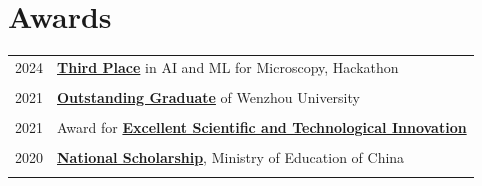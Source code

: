 \documentclass[a4paper,10pt]{article} %
\begin{document}
\section{Awards}
\begin{tabular}{r|l}	
2024                        & \href{https://way2ml.github.io/_static/cv/2025-01-09-00-25-Hackathon_Microscopy.pdf}{\textbf{Third Place}} in AI and ML for Microscopy, Hackathon \\
\multicolumn{2}{c}{} \\	%


2021                        & \href{https://way2ml.github.io/_static/cv/2021_11_26_10_1.pdf}{\textbf{Outstanding Graduate}} of Wenzhou University\\ %
\multicolumn{2}{c}{} \\	%

2021        				    & Award for \href{https://way2ml.github.io/_static/cv/2021_11_26_10_3.pdf}{\textbf{Excellent Scientific and Technological Innovation}} \\ %
\multicolumn{2}{c}{} \\	%

2020                        & \href{https://way2ml.github.io/_static/cv/2021_11_26_10_N.pdf}{\textbf{National Scholarship}}, Ministry of Education of China\\ %
\multicolumn{2}{c}{} \\	%


%



\end{tabular}
\end{document}

